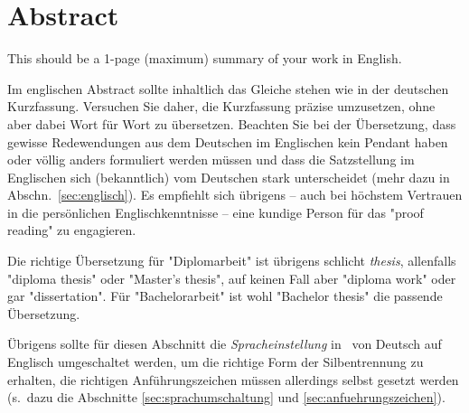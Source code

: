 \chapter{Abstract}

\begin{english} %
This should be a 1-page (maximum) summary of your work in English.
\end{english}

Im englischen Abstract sollte inhaltlich das Gleiche
stehen wie in der deutschen Kurzfassung. Versuchen Sie daher, die
Kurzfassung prä\-zise umzusetzen, ohne aber dabei Wort für Wort zu
übersetzen. Beachten Sie bei der Übersetzung, dass gewisse
Redewendungen aus dem Deutschen im Englischen kein Pendant haben
oder völlig anders formuliert werden müssen und dass die
Satzstellung im Englischen sich (bekanntlich) vom Deutschen stark
unterscheidet (mehr dazu in Abschn.\ \ref{sec:englisch}). Es
empfiehlt sich übrigens -- auch bei höchstem Vertrauen in die
persönlichen Englischkenntnisse -- eine kundige Person für das
"proof reading" zu engagieren.

Die richtige Übersetzung für "Diplomarbeit" ist übrigens
schlicht \emph{thesis}, allenfalls  "diploma thesis" oder "Master's thesis", 
auf keinen Fall aber "diploma work" oder gar "dissertation". 
Für "Bachelorarbeit" ist wohl "Bachelor thesis" die passende Übersetzung. 

Übrigens sollte für diesen Abschnitt die \emph{Spracheinstellung} in \latex\ von Deutsch
auf Englisch umgeschaltet werden, um die richtige Form der
Silbentrennung zu erhalten, die richtigen Anführungszeichen müssen allerdings selbst gesetzt werden %
(s.\ dazu die Abschnitte \ref{sec:sprachumschaltung} %
und \ref{sec:anfuehrungszeichen}).
